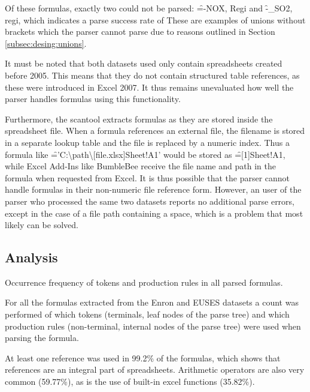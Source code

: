 Of these formulas, exactly two could not be parsed: \f{=-NOX, Regi} and \f{-_SO2, regi}, which indicates a parse success rate of 
These are examples of unions without brackets which the parser cannot parse due to reasons outlined in Section \ref{subsec:desing:unions}.
 
It must be noted that both datasets used only contain spreadsheets created before 2005.
This means that they do not contain structured table references, as these were introduced in Excel 2007.
It thus remains unevaluated how well the parser handles formulas using this functionality.

Furthermore, the scantool extracts formulas as they are stored inside the spreadsheet file.
When a formula references an external file, the filename is stored in a separate lookup table and the file is replaced by a numeric index.
Thus a formula like \f{='C:\textbackslash path\textbackslash [file.xlsx]Sheet!A1'} would be stored as \f{=[1]Sheet!A1}, while Excel Add-Ins like BumbleBee receive the file name and path in the formula when requested from Excel.
It is thus possible that the parser cannot handle formulas in their non-numeric file reference form.
However, an user of the parser who processed the same two datasets reports no additional parse errors, except in the case of a file path containing a space, which is a problem that most likely can be solved.

\subsection{Analysis}

\begin{table}
	\centering
	\caption{Occurrence frequency of tokens and production rules in all parsed formulas.}
	\label{table:occurences}
\end{table}

For all the formulas extracted from the Enron and EUSES datasets a count was performed of which tokens (terminals, leaf nodes of the parse tree) and which production rules (non-terminal, internal nodes of the parse tree) were used when parsing the formula.

At least one reference was used in 99.2\% of the formulas, which shows that references are an integral part of spreadsheets.
Arithmetic operators are also very common (59.77\%), as is the use of built-in excel functions (35.82\%).

